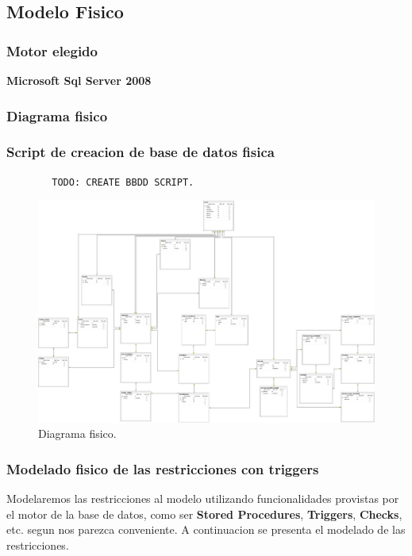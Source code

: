 \subsection{Modelo Fisico}
\subsubsection{Motor elegido}

\textbf{Microsoft Sql Server 2008}

\subsubsection{Diagrama fisico}
\subsubsection{Script de creacion de base de datos fisica}
	\begin{lstlisting}
		TODO: CREATE BBDD SCRIPT.
	\end{lstlisting}
\begin{landscape}
	\begin{figure}[t]
	  \centering	
		\includegraphics[scale=0.35]{fig/modelo-fisico.png}
	  \caption{Diagrama fisico.}
	\end{figure}
\end{landscape}
\subsubsection{Modelado fisico de las restricciones con triggers}
Modelaremos las restricciones al modelo utilizando funcionalidades provistas por el motor de la base de datos, como ser \textbf{Stored Procedures}, \textbf{Triggers}, \textbf{Checks}, etc. segun nos parezca conveniente. A continuacion se presenta el modelado de las restricciones.

